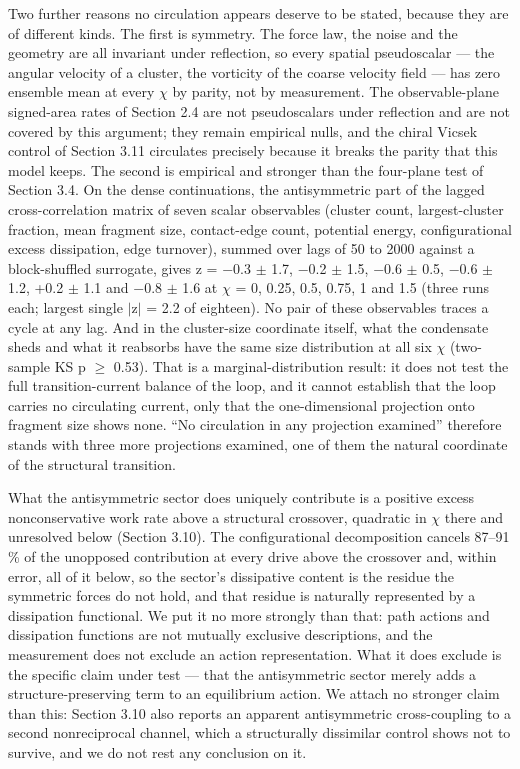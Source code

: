 \documentclass[aps,pre,preprint,superscriptaddress,nofootinbib,longbibliography]{revtex4-2}
\begin{document}
Two further reasons no circulation appears deserve to be stated, because they are of different kinds. The first is symmetry. The force law, the noise and the geometry are all invariant under reflection, so every spatial pseudoscalar --- the angular velocity of a cluster, the vorticity of the coarse velocity field --- has zero ensemble mean at every $\chi$ by parity, not by measurement. The observable-plane signed-area rates of Section 2.4 are not pseudoscalars under reflection and are not covered by this argument; they remain empirical nulls, and the chiral Vicsek control of Section 3.11 circulates precisely because it breaks the parity that this model keeps. The second is empirical and stronger than the four-plane test of Section 3.4. On the dense continuations, the antisymmetric part of the lagged cross-correlation matrix of seven scalar observables (cluster count, largest-cluster fraction, mean fragment size, contact-edge count, potential energy, configurational excess dissipation, edge turnover), summed over lags of 50 to 2000 against a block-shuffled surrogate, gives z = $-$0.3 $\pm$ 1.7, $-$0.2 $\pm$ 1.5, $-$0.6 $\pm$ 0.5, $-$0.6 $\pm$ 1.2, +0.2 $\pm$ 1.1 and $-$0.8 $\pm$ 1.6 at $\chi$ = 0, 0.25, 0.5, 0.75, 1 and 1.5 (three runs each; largest single
$|$z$|$ = 2.2 of eighteen). No pair of these observables traces a cycle at any lag. And in the cluster-size coordinate itself, what the condensate sheds and what it reabsorbs have the same size distribution at all six $\chi$ (two-sample KS p $\ge$ 0.53). That is a marginal-distribution result: it does not test the full transition-current balance of the loop, and it cannot establish that the loop carries no circulating current, only that the one-dimensional projection onto fragment size shows none. ``No circulation in any projection examined'' therefore stands with three more projections examined, one of them the natural coordinate of the structural transition.

What the antisymmetric sector does uniquely contribute is a positive excess nonconservative work rate above a structural crossover, quadratic in $\chi$ there and unresolved below (Section 3.10). The configurational decomposition cancels 87--91 \% of the unopposed contribution at every drive above the crossover and, within error, all of it below, so the sector's dissipative content is the residue the symmetric forces do not hold, and that residue is naturally represented by a dissipation functional. We put it no more strongly than that: path actions and dissipation functions are not mutually exclusive descriptions, and the measurement does not exclude an action representation. What it does exclude is the specific claim under test --- that the antisymmetric sector merely adds a structure-preserving term to an equilibrium action. We attach no stronger claim than this: Section 3.10 also reports an apparent antisymmetric cross-coupling to a second nonreciprocal channel, which a structurally dissimilar control shows not to survive, and we do not rest any conclusion on it.
\end{document}
